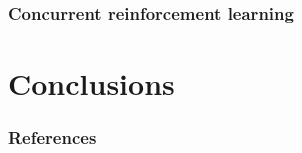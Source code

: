 \documentclass{article} %
\begin{document}
\subsubsection{Concurrent reinforcement learning}

\section{Conclusions}

\subsubsection*{References}

\printbibliography[heading=none]
\end{document}
